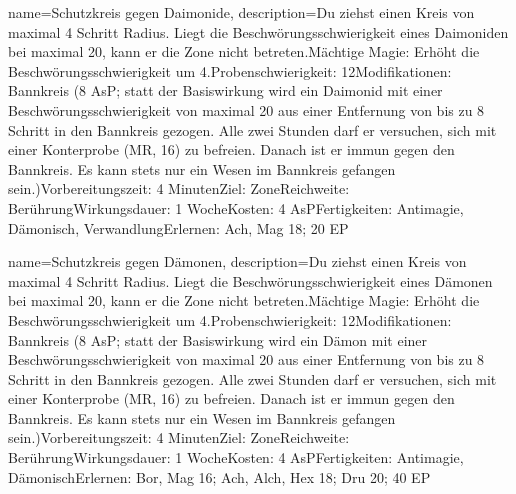 {
    name={Schutzkreis gegen Daimonide},
    description={Du ziehst einen Kreis von maximal 4 Schritt Radius. Liegt die Beschwörungsschwierigkeit eines Daimoniden bei maximal 20, kann er die Zone nicht betreten.\newline Mächtige Magie: Erhöht die Beschwörungsschwierigkeit um 4.\newline Probenschwierigkeit: 12\newline Modifikationen: Bannkreis (8 AsP; statt der Basiswirkung wird ein Daimonid mit einer Beschwörungsschwierigkeit von maximal 20 aus einer Entfernung von bis zu 8 Schritt in den Bannkreis gezogen. Alle zwei Stunden darf er versuchen, sich mit einer Konterprobe (MR, 16) zu befreien. Danach ist er immun gegen den Bannkreis. Es kann stets nur ein Wesen im Bannkreis gefangen sein.)\newline Vorbereitungszeit: 4 Minuten\newline Ziel: Zone\newline Reichweite: Berührung\newline Wirkungsdauer: 1 Woche\newline Kosten: 4 AsP\newline Fertigkeiten: Antimagie, Dämonisch, Verwandlung\newline Erlernen: Ach, Mag 18; 20 EP}
}


{
    name={Schutzkreis gegen Dämonen},
    description={Du ziehst einen Kreis von maximal 4 Schritt Radius. Liegt die Beschwörungsschwierigkeit eines Dämonen bei maximal 20, kann er die Zone nicht betreten.\newline Mächtige Magie: Erhöht die Beschwörungsschwierigkeit um 4.\newline Probenschwierigkeit: 12\newline Modifikationen: Bannkreis (8 AsP; statt der Basiswirkung wird ein Dämon mit einer Beschwörungsschwierigkeit von maximal 20 aus einer Entfernung von bis zu 8 Schritt in den Bannkreis gezogen. Alle zwei Stunden darf er versuchen, sich mit einer Konterprobe (MR, 16) zu befreien. Danach ist er immun gegen den Bannkreis. Es kann stets nur ein Wesen im Bannkreis gefangen sein.)\newline Vorbereitungszeit: 4 Minuten\newline Ziel: Zone\newline Reichweite: Berührung\newline Wirkungsdauer: 1 Woche\newline Kosten: 4 AsP\newline Fertigkeiten: Antimagie, Dämonisch\newline Erlernen: Bor, Mag 16; Ach, Alch, Hex 18; Dru 20; 40 EP}
}


